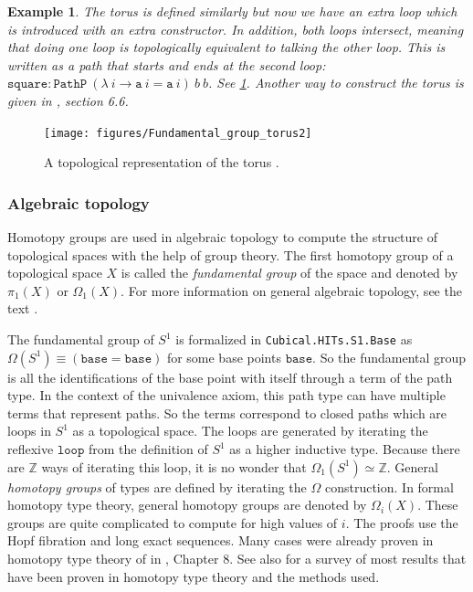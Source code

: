\documentclass[11pt,a4paper,twoside,xetex,draft]{book}
\newcommand{\keyword}[1]{\emph{#1}\index{#1}}
\newtheorem{example}[theorem]{Example}
\newcommand{\op}[1]{\mathtt{#1}}
\begin{document}
\begin{example}
The \keyword{torus} is defined similarly but now we have an extra loop which is introduced with an extra constructor. In addition, both loops intersect, meaning that doing one loop is topologically equivalent to talking the other loop. This is written as a path that starts and ends at the second loop: $\op{square} : \op{PathP} \ (\lambda \ i \rightarrow \op{a} \ i = \op{a} \ i) \ b  \ b$. See \cref{torus}. Another way to construct the torus is given in \cite{Voevodsky2013}, section 6.6.
\end{example}

\begin{figure}
\centering
\texttt{[image: figures/Fundamental\_group\_torus2]}
\caption{A topological representation of the torus \cite{Dinkelbach2005}. \label{torus}}
\end{figure}

\subsubsection{Algebraic topology}\label{higherhomotopy}

Homotopy groups are used in algebraic topology to compute the structure of topological spaces with the help of group theory.  The first homotopy group of a topological space $X$ is called the \keyword{fundamental group} of the space and denoted by $\pi_1 (X)$ or $\Omega_1 (X)$. For more information on general algebraic topology, see the text \cite{Hatcher2001}.

The fundamental group of $S^1$ is formalized in \texttt{Cubical.HITs.S1.Base} as $\Omega (S^1) \equiv (\op{base} = \op{base})$ for some base points $\op{base}$. So the fundamental group is all the identifications of the base point with itself through a term of the path type. In the context of the univalence axiom, this path type can have multiple terms that represent paths. So the terms correspond to closed paths which are loops in $S^1$ as a topological space. The loops are generated by iterating the reflexive $\op{loop}$ from the definition of $S^1$ as a higher inductive type. Because there are $\mathbb{Z}$ ways of iterating this loop, it is no wonder that $\Omega_1 (S^1) \simeq \mathbb{Z}$. General \keyword{homotopy groups} of types are defined by iterating the $\Omega$ construction. In formal homotopy type theory, general homotopy groups are denoted by $\Omega_i (X)$. These groups are quite complicated to compute for high values of $i$. The proofs use the Hopf fibration and long exact sequences. Many cases were already proven in homotopy type theory of in \cite{Voevodsky2013}, Chapter 8. See also \cite{Licata2013May} for a survey of most results that have been proven in homotopy type theory and the methods used.
\end{document}
